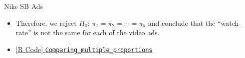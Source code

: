 \begin{Example}{Nike SB Ads}{}
\begin{itemize}
                  \[ t=\sum_{\ell=0}^{1} \sum_{j=1}^{m} \frac{(O_{\ell,j}-E_{\ell,j})^2}{E_{\ell,j}} =129.1686 \]
                  \[ p\text{-value}=\Prob{T\ge 129.1686}=5.86\times 10^{-27} \]
            \item Therefore, we reject $ H_0 $: $ \pi_1=\pi_2=\cdots=\pi_5 $ and conclude that
                  the ``watch-rate'' is not the same for each of the video ads.
            \item \href{https://github.com/Hextical/university-notes/blob/master/year-3/semester-3/STAT 430/code/Comparing_multiple_proportions.R}{[R Code] \texttt{Comparing\_multiple\_proportions}}
      \end{itemize}
\end{Example}
